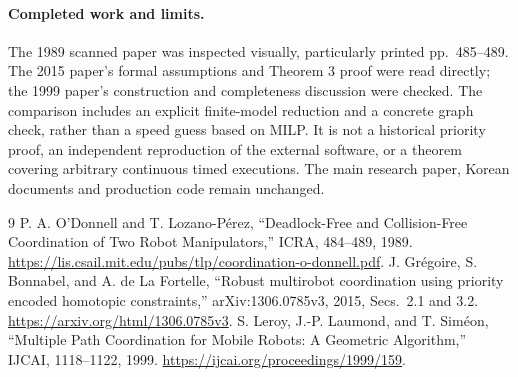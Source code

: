 \documentclass[11pt,a4paper]{article}
\begin{document}
\paragraph{Completed work and limits.}
The 1989 scanned paper was inspected visually, particularly printed pp.~485--489.
The 2015 paper's formal assumptions and Theorem 3 proof were read directly;
the 1999 paper's construction and completeness discussion were checked. The
comparison includes an explicit finite-model reduction and a concrete graph
check, rather than a speed guess based on MILP. It is not a historical priority
proof, an independent reproduction of the external software, or a theorem
covering arbitrary continuous timed executions. The main research paper,
Korean documents and production code remain unchanged.

\begin{thebibliography}{9}\small
{} P. A. O'Donnell and T. Lozano-P\'erez, ``Deadlock-Free and
Collision-Free Coordination of Two Robot Manipulators,'' ICRA, 484--489, 1989.
\url{https://lis.csail.mit.edu/pubs/tlp/coordination-o-donnell.pdf}.
 J. Gr\'egoire, S. Bonnabel, and A. de La Fortelle,
``Robust multirobot coordination using priority encoded homotopic constraints,''
arXiv:1306.0785v3, 2015, Secs.~2.1 and 3.2.
\url{https://arxiv.org/html/1306.0785v3}.
 S. Leroy, J.-P. Laumond, and T. Sim\'eon, ``Multiple Path
Coordination for Mobile Robots: A Geometric Algorithm,'' IJCAI, 1118--1122,
1999. \url{https://ijcai.org/proceedings/1999/159}.
\end{thebibliography}
\end{document}
